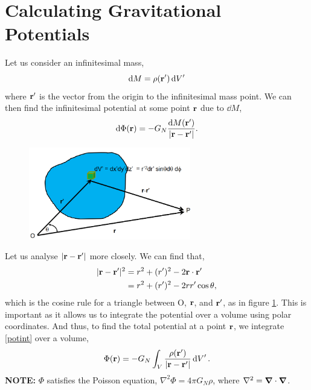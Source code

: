 \documentclass{book}
\begin{document}
\section{Calculating Gravitational Potentials}
Let us consider an infinitesimal mass,
\begin{equation}
    \dd{M} = \rho(\vb{r}')\dd{V'}
\end{equation}
where $\vb{r}'$ is the vector from the origin to the infinitesimal mass point. We can then find the infinitesimal potential at some point $\vb{r}$ due to $\dd{M}$,
\begin{equation}
    \dd{\Phi(\vb{r}}) = -G_N \frac{\dd{M(\vb{r}')}}{|\vb{r}-\vb{r}'|}. \label{potint}
\end{equation}
\begin{figure}
    \centering
    \includegraphics[width=200pt]{1.png}
    \caption{}
    \label{fig:pot}
\end{figure}
Let us analyse $|\vb{r} - \vb{r}'|$ more closely. We can find that,
\begin{equation}
\begin{split}
    |\vb{r} - \vb{r}'|^2 & = r^2 + (r')^2 - 2\vb{r}\cdot\vb{r}' \\
    & = r^2 + (r')^2 -2rr'\cos\theta,
\end{split}
\end{equation}
which is the cosine rule for a triangle between O, $\vb{r}$, and $\vb{r}'$, as in figure \ref{fig:pot}. This is important as it allows us to integrate the potential over a volume using polar coordinates. And thus, to find the total potential at a point $\vb{r}$, we integrate \eqref{potint} over a volume,
\begin{equation}
    \Phi(\vb{r}) = -G_N \int_V \frac{\rho(\vb{r}')}{|\vb{r} - \vb{r}'|}\dd{V}'.
\end{equation}
\textbf{NOTE:} $\Phi$ satisfies the Poisson equation, $\nabla^2\Phi = 4\pi G_N \rho$, where $\nabla^2 = \grad \cdot \grad$.
\end{document}
